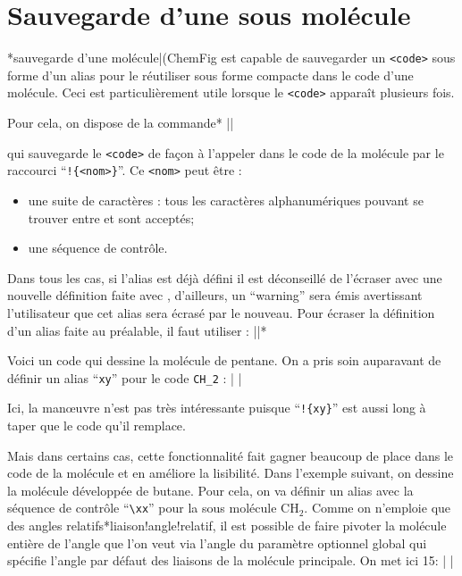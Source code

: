 \documentclass[10pt]{article}
\makeatletter
\newcommand\idx{\@ifstar{\let\print@or@not\@gobble\idx@}{\let\print@or@not\@firstofone\idx@}}
\newcommand\idx@[1]{%
	\ifcat\expandafter\noexpand\@car#1\@nil\relax%
		\expandafter\ifx\@car#1\@nil\protect
			\index{#1}%
			\print@or@not{#1}%
		\else
			\saveexpandmode\expandarg
			\StrSubstitute{\string#1}{\string @}{\@empty\protect\symbol{'100}}[\temp@]%
			\StrGobbleLeft\temp@1[\temp@]%
			\restoreexpandmode
			\expandafter\index\expandafter{\temp@ @\protect\texttt{\protect\textbackslash\temp@}}%
			\print@or@not{\texttt{\string#1}}%
		\fi
	\else
		\index{#1}%
		\print@or@not{#1}%
	\fi
}
\newcommand\make@car@active[1]{%
	\catcode`#1\active
	\begingroup
		\lccode`\~`#1\relax
		\lowercase{\endgroup\def~}%
}
\newif\if@exstar
\newcommand\exemple{%
	\begingroup
	\parskip\z@
	\@makeother\;\@makeother\!\@makeother\?\@makeother\:%
	\@ifstar{\@exstartrue\exemple@}{\@exstarfalse\exemple@}}
\newcommand\exemple@[2][65]{%
	\medbreak\noindent
	\begingroup
		\let\do\@makeother\dospecials
		\make@car@active\ { {}}%
		\make@car@active\^^M{\par\leavevmode}%
		\make@car@active\,{\leavevmode\kern\z@\string,}%
		\make@car@active\-{\leavevmode\kern\z@\string-}%
		\make@car@active\>{\leavevmode\kern\z@\string>}%
		\make@car@active\<{\leavevmode\kern\z@\string<}%
		\exemple@@{#1}{#2}%
}
\newcommand\exemple@@[3]{%
	\def\@tempa##1#3{\exemple@@@{#1}{#2}{##1}}%
	\@tempa
}
\newcommand\exemple@@@[3]{%
	\xdef\the@code{#3}%
	\endgroup
	\if@exstar
		\begingroup
			\fboxrule0.4pt
			\let\breakboxparindent\z@
			\def\bkvz@bottom{\hrule\@height\fboxrule}%
			\let\bkvz@before@breakbox\relax
			\def\bkvz@set@linewidth{\advance\linewidth\dimexpr-2\fboxrule-2\fboxsep}%
			\def\bkvz@left{\vrule\@width\fboxrule\hskip\fboxsep}%
			\def\bkvz@right{\hskip\fboxsep\vrule\@width\fboxrule}%
			\def\bkvz@top{\hbox to \hsize{%
				\vrule\@width\fboxrule\@height\fboxrule
				\leaders\bkvz@bottom\hfill
				\ECFAugie
				\fboxsep\z@
				\colorbox{black}{\kern0.25em\color{white}\footnotesize\lower0.5ex\hbox{\strut#2}\kern0.25em}%
				\leaders\bkvz@bottom\hfill
				\vrule\@width\fboxrule\@height\fboxrule}}%
			\breakbox
				\kern.5ex\relax
				\ttfamily\footnotesize\the@code\par
				\normalfont
				\kern3pt
				\hrule height0.1pt width\linewidth depth0.1pt
				\vskip5pt
				\rightskip0pt plus 1fill
				\everypar{{\color{lightgray}\rlap{\vrule height0.1pt width\linewidth depth0.1pt}}\hskip0pt plus 1fill}%
				\newlinechar`\^^M\everyeof{\noexpand}\scantokens{#3}\par
			\endbreakbox
		\endgroup
	\else
		\vskip0.5ex
		\boxput*(0,1)
			{\fboxsep\z@
			\hbox{\ECFAugie\colorbox{black}{\leavevmode\kern0.25em{\color{white}\footnotesize\strut#2}\kern0.25em}}%
			}%
			{\fboxsep5pt
			\fbox{%
				$\vcenter{\hsize\dimexpr0.#1\linewidth-\fboxsep-\fboxrule\relax
					\kern5pt\parskip0pt \ttfamily\footnotesize\the@code}%
				\vcenter{\kern5pt\hsize\dimexpr\linewidth-0.#1\linewidth-\fboxsep-\fboxrule\relax
					\everypar{{\color{lightgray}\rlap{\vrule height0.1pt width\dimexpr\linewidth-0.#1\linewidth-\fboxsep-\fboxrule depth0.1pt}}}%
					\footnotesize\newlinechar`\^^M\everyeof{\noexpand}\scantokens{#3}}$%
				}%
			}%
	\fi
	\medbreak
	\endgroup
}
\let\do\@makeother\dospecials
\newcommand\CF{{\ECFAugie ChemFig}\xspace}
\makeatother
\begin{document}
\section{Sauvegarde d'une sous molécule}\label{definesubmol}
\idx*{sauvegarde d'une molécule|(}\CF est capable de sauvegarder un \verb-<code>- sous forme d'un alias pour le réutiliser sous forme compacte dans le code d'une molécule. Ceci est particulièrement utile lorsque le \verb-<code>- apparaît plusieurs fois.

Pour cela, on dispose de la commande\idx*{}
\centerverb||
\smallskip

qui sauvegarde le \verb/<code>/ de façon à l'appeler dans le code de la molécule par le raccourci ``\verb/!{<nom>}/''. Ce \verb-<nom>- peut être :
\begin{itemize}
	\item une suite de caractères : tous les caractères alphanumériques pouvant se trouver entre \texttt{\string\csname} et \texttt{\string\endcsname} sont acceptés;
	\item une séquence de contrôle.
\end{itemize}

Dans tous les cas, si l'alias est déjà défini il est déconseillé de l'écraser avec une nouvelle définition faite avec \idx{\definesubmol}, d'ailleurs, un ``warning'' sera émis avertissant l'utilisateur que cet alias sera écrasé par le nouveau. Pour écraser la définition d'un alias faite au préalable, il faut utiliser :\label{redefinesubmol}
\centerverb||\idx*\redefinesubmol
\smallskip

Voici un code qui dessine la molécule de pentane. On a pris soin auparavant de définir un alias ``\verb/xy/'' pour le code \verb/CH_2/ :
\exemple{Pentane}|
|

Ici, la manœuvre n'est pas très intéressante puisque ``\verb/!{xy}/'' est aussi long à taper que le code qu'il remplace.

Mais dans certains cas, cette fonctionnalité fait gagner beaucoup de place dans le code de la molécule et en améliore la lisibilité. Dans l'exemple suivant, on dessine la molécule développée de butane. Pour cela, on va définir un alias avec la séquence de contrôle ``\verb/\xx/'' pour la sous molécule $\mathrm{CH_2}$. Comme on n'emploie que des angles relatifs\idx*{liaison!angle!relatif}, il est possible de faire pivoter la molécule entière de l'angle que l'on veut via l'angle du paramètre optionnel global qui spécifie l'angle par défaut des liaisons de la molécule principale. On met ici 15\degres :
\exemple{Butane}|
|
\end{document}
